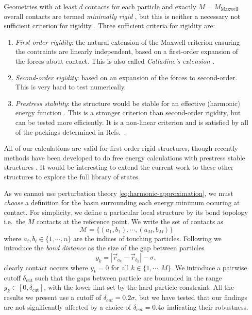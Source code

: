 \documentclass[11pt,twoside]{report}
\begin{document}
Geometries with at least $d$ contacts for each particle and exactly $M = M_\mathrm{Maxwell}$ overall contacts are termed \emph{minimally rigid} \cite{ArkusPRL2009}, but this is neither a necessary not sufficient criterion for rigidity \cite{Holmes-CerfonARCMP2017}.
Three sufficient criteria for rigidity are: \cite{ConnellySJDM1996,Holmes-CerfonARCMP2017}
\begin{enumerate}
\item \emph{First-order rigidity}: the natural extension of the Maxwell criterion ensuring the contraints are linearly independent, based on a first-order expansion of the forces about contact.
  This is also called \emph{Calladine's extension} \cite{CalladineIJSS1978}.
\item \emph{Second-order rigidity}: based on an expansion of the forces to second-order.
  This is very hard to test numerically.
\item \emph{Prestress stability}: the structure would be stable for an effective (harmonic) energy function \cite{ConnellySJDM1996}.
  This is a stronger criterion than second-order rigidity, but can be tested more efficiently.
  It is a non-linear criterion and is satisfied by all of the packings determined in Refs.\ \cite{ArkusPRL2009,Holmes-CerfonSR2016}.
\end{enumerate}
All of our calculations are valid for first-order rigid structures, though recently methods have been developed to do free energy calculations with prestress stable structures \cite{KallusPRE2017}.
It would be interesting to extend the current work to these other structures to explore the full library of states.

As we cannot use perturbation theory \eqref{eq:harmonic-approximation}, we must \emph{choose} a definition for the basin surrounding each energy minimum occuring at contact.
For simplicity, we define a particular local structure by its bond topology i.e.\ the $M$ contacts at the reference point.
We write the set of contacts as
\begin{equation}\label{eq:structure-contacts}
  \mathcal{M} = \{(a_1, b_1), \cdots, (a_M, b_M)\}
\end{equation}
where $a_i, b_i \in \{1, \cdots, n\}$ are the indices of touching particles.
Following \cite{Holmes-CerfonPNAS2013} we introduce the \emph{bond distance} as the size of the gap between particles
\begin{equation}\label{eq:bond-distance}
  y_k = |\vec{r}_{a_k} - \vec{r}_{b_k}| - \sigma,
\end{equation}
clearly contact occurs where $y_k = 0$ for all $k \in \{1, \cdots, M\}$.
We introduce a pairwise cutoff $\delta_\mathrm{cut}$ such that the gaps between particle are bonunded in the range $y_k \in [0, \delta_\mathrm{cut}]$, with the lower limt set by the hard particle constraint.
All the results we present use a cutoff of $\delta_{cut}=0.2 \sigma$, but we have tested that our findings are not significantly affected by a choice of $\delta_{cut}=0.4 \sigma$ indicating their robustness.
\end{document}
